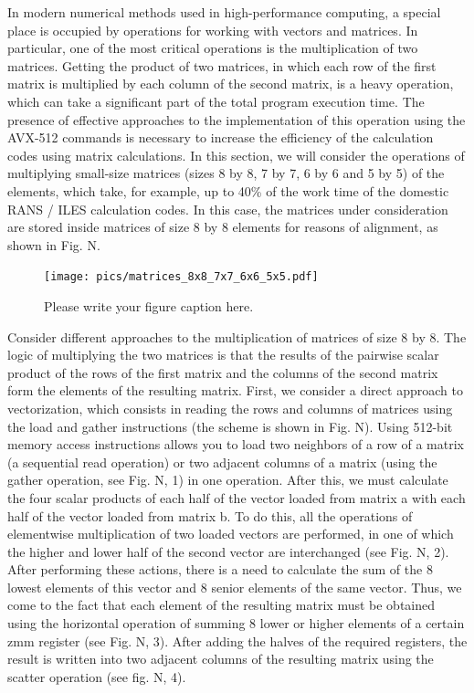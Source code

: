 \documentclass[
11pt,%
tightenlines,%
twoside,%
onecolumn,%
nofloats,%
nobibnotes,%
nofootinbib,%
superscriptaddress,%
noshowpacs,%
centertags]%
{revtex4}
\begin{document}
In modern numerical methods used in high-performance computing, a special place is occupied by operations for working with vectors and matrices. In particular, one of the most critical operations is the multiplication of two matrices. Getting the product of two matrices, in which each row of the first matrix is multiplied by each column of the second matrix, is a heavy operation, which can take a significant part of the total program execution time. The presence of effective approaches to the implementation of this operation using the AVX-512 commands is necessary to increase the efficiency of the calculation codes using matrix calculations. In this section, we will consider the operations of multiplying small-size matrices (sizes 8 by 8, 7 by 7, 6 by 6 and 5 by 5) of the elements, which take, for example, up to 40\% of the work time of the domestic RANS / ILES calculation codes. In this case, the matrices under consideration are stored inside matrices of size 8 by 8 elements for reasons of alignment, as shown in Fig. N.

\begin{figure}[h]
\setcaptionmargin{5mm}
\onelinecaptionstrue  %
\texttt{[image: pics/matrices\_8x8\_7x7\_6x6\_5x5.pdf]}
\caption{Please write your figure caption here.}\label{fig:1}
\end{figure}

Consider different approaches to the multiplication of matrices of size 8 by 8. The logic of multiplying the two matrices is that the results of the pairwise scalar product of the rows of the first matrix and the columns of the second matrix form the elements of the resulting matrix. First, we consider a direct approach to vectorization, which consists in reading the rows and columns of matrices using the load and gather instructions (the scheme is shown in Fig. N). Using 512-bit memory access instructions allows you to load two neighbors of a row of a matrix (a sequential read operation) or two adjacent columns of a matrix (using the gather operation, see Fig. N, 1) in one operation. After this, we must calculate the four scalar products of each half of the vector loaded from matrix a with each half of the vector loaded from matrix b. To do this, all the operations of elementwise multiplication of two loaded vectors are performed, in one of which the higher and lower half of the second vector are interchanged (see Fig. N, 2). After performing these actions, there is a need to calculate the sum of the 8 lowest elements of this vector and 8 senior elements of the same vector. Thus, we come to the fact that each element of the resulting matrix must be obtained using the horizontal operation of summing 8 lower or higher elements of a certain zmm register (see Fig. N, 3). After adding the halves of the required registers, the result is written into two adjacent columns of the resulting matrix using the scatter operation (see fig. N, 4).
\end{document}
